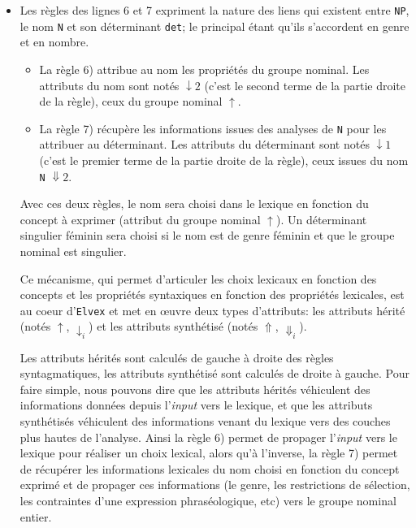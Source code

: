 \documentclass[11pt]{article}
\begin{document}
\begin{itemize}
\item Les règles des lignes 6 et 7 expriment la nature des liens qui
  existent entre \texttt{NP}, le nom \texttt{N} et son déterminant
  \texttt{det}; le principal étant qu'ils s'accordent en genre et en
  nombre.

  \begin{itemize}
  \item La règle 6) attribue au nom les propriétés du groupe
    nominal. Les attributs du nom sont notés $\downarrow2$ (c'est le
    second terme de la partie droite de la règle), ceux du
    groupe nominal $\uparrow$.
  \item La règle 7) récupère les informations issues des
    analyses de \texttt{N} pour les attribuer au déterminant.  Les
    attributs du déterminant sont notés $\downarrow1$ (c'est le premier
    terme de la partie droite de la règle), ceux issues du nom \texttt{N}
    $\Downarrow2$.
  \end{itemize}
  
  Avec ces deux règles, le nom sera choisi dans le lexique en fonction
  du concept à exprimer (attribut du groupe nominal $\uparrow$).  Un
  déterminant singulier féminin sera choisi si le nom est de genre
  féminin et que le groupe nominal est singulier.
  
  Ce mécanisme, qui permet d'articuler les choix lexicaux en fonction des
  concepts et les propriétés syntaxiques en fonction des propriétés
  lexicales, est au coeur d'\texttt{Elvex} et met en {\oe}uvre deux types
  d'attributs: les attributs hérité (notés $\uparrow$, $\downarrow_i$)
  et les attributs synthétisé (notés $\Uparrow$, $\Downarrow_i$).
  
  Les attributs hérités sont calculés de gauche à droite des règles
  syntagmatiques, les attributs synthétisé sont calculés de droite à
  gauche. Pour faire simple, nous pouvons dire que les attributs hérités
  véhiculent des informations données depuis l'\textit{input} vers le
  lexique, et que les attributs synthétisés véhiculent des informations
  venant du lexique vers des couches plus hautes de l'analyse. Ainsi la
  règle 6) permet de propager l'\textit{input} vers le lexique pour
  réaliser un choix lexical, alors qu'à l'inverse, la règle 7) permet de
  récupérer les informations lexicales du nom choisi en fonction du
  concept exprimé et de propager ces informations (le genre, les
  restrictions de sélection, les contraintes d'une expression
  phraséologique, etc) vers le groupe nominal entier.
  

\end{itemize}
\end{document}
